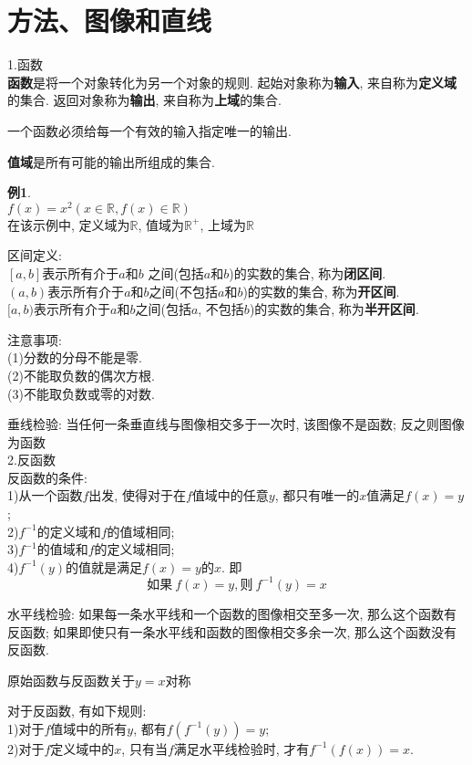 \chapter{方法、图像和直线}
1.函数\\
\textbf{函数}是将一个对象转化为另一个对象的规则. 起始对象称为\textbf{输入}, 来自称为\textbf{定义域}的集合. 返回对象称为\textbf{输出}, 来自称为\textbf{上域}的集合.

一个函数必须给每一个有效的输入指定唯一的输出.

\textbf{值域}是所有可能的输出所组成的集合.

\textbf{例1}.\\
$f(x)=x^2(x\in\mathbb{R}, f(x)\in\mathbb{R})$\\
在该示例中, 定义域为$\mathbb{R}$, 值域为$\mathbb{R}^+$, 上域为$\mathbb{R}$

区间定义:\\
$[a,b]$表示所有介于$a$和$b$ 之间(包括$a$和$b$)的实数的集合, 称为\textbf{闭区间}.\\
$(a,b)$表示所有介于$a$和$b$之间(不包括$a$和$b$)的实数的集合, 称为\textbf{开区间}.\\
$[a,b)$表示所有介于$a$和$b$之间(包括$a$, 不包括$b$)的实数的集合, 称为\textbf{半开区间}.

注意事项:\\
(1)分数的分母不能是零.\\
(2)不能取负数的偶次方根.\\
(3)不能取负数或零的对数.

垂线检验: 当任何一条垂直线与图像相交多于一次时, 该图像不是函数; 反之则图像为函数\\[2ex]

2.反函数\\
反函数的条件:\\
1)从一个函数$f$出发, 使得对于在$f$值域中的任意$y$, 都只有唯一的$x$值满足$f(x)=y$;\\
2)$f^{-1}$的定义域和$f$的值域相同;\\
3)$f^{-1}$的值域和$f$的定义域相同;\\
4)$f^{-1}(y)$的值就是满足$f(x)=y$的$x$. 即
\[\text{如果}\ f(x)=y, \text{则}\ f^{-1}(y)=x\]

水平线检验: 如果每一条水平线和一个函数的图像相交至多一次, 那么这个函数有反函数; 如果即使只有一条水平线和函数的图像相交多余一次, 那么这个函数没有反函数.

原始函数与反函数关于$y=x$对称

对于反函数, 有如下规则:\\
1)对于$f$值域中的所有$y$, 都有$f(f^{-1}(y))=y$;\\
2)对于$f$定义域中的$x$, 只有当$f$满足水平线检验时, 才有$f^{-1}(f(x))=x$.

